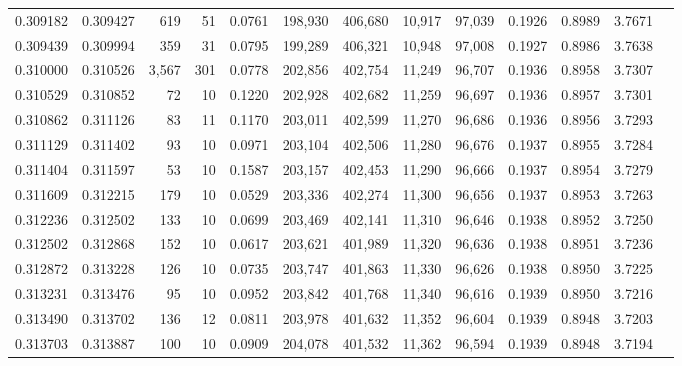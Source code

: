 \begin{tabular}{rrrrrrrrrrrrr}
0.309182 & 0.309427 &   619 &  51 &                                     0.0761 & 198,930 & 406,680 &  10,917 &  97,039 & 0.1926 & 0.8989 & 3.7671 \\
0.309439 & 0.309994 &   359 &  31 &                                     0.0795 & 199,289 & 406,321 &  10,948 &  97,008 & 0.1927 & 0.8986 & 3.7638 \\
0.310000 & 0.310526 & 3,567 & 301 &                                     0.0778 & 202,856 & 402,754 &  11,249 &  96,707 & 0.1936 & 0.8958 & 3.7307 \\
0.310529 & 0.310852 &    72 &  10 &                                     0.1220 & 202,928 & 402,682 &  11,259 &  96,697 & 0.1936 & 0.8957 & 3.7301 \\
0.310862 & 0.311126 &    83 &  11 &                                     0.1170 & 203,011 & 402,599 &  11,270 &  96,686 & 0.1936 & 0.8956 & 3.7293 \\
0.311129 & 0.311402 &    93 &  10 &                                     0.0971 & 203,104 & 402,506 &  11,280 &  96,676 & 0.1937 & 0.8955 & 3.7284 \\
0.311404 & 0.311597 &    53 &  10 &                                     0.1587 & 203,157 & 402,453 &  11,290 &  96,666 & 0.1937 & 0.8954 & 3.7279 \\
0.311609 & 0.312215 &   179 &  10 &                                     0.0529 & 203,336 & 402,274 &  11,300 &  96,656 & 0.1937 & 0.8953 & 3.7263 \\
0.312236 & 0.312502 &   133 &  10 &                                     0.0699 & 203,469 & 402,141 &  11,310 &  96,646 & 0.1938 & 0.8952 & 3.7250 \\
0.312502 & 0.312868 &   152 &  10 &                                     0.0617 & 203,621 & 401,989 &  11,320 &  96,636 & 0.1938 & 0.8951 & 3.7236 \\
0.312872 & 0.313228 &   126 &  10 &                                     0.0735 & 203,747 & 401,863 &  11,330 &  96,626 & 0.1938 & 0.8950 & 3.7225 \\
0.313231 & 0.313476 &    95 &  10 &                                     0.0952 & 203,842 & 401,768 &  11,340 &  96,616 & 0.1939 & 0.8950 & 3.7216 \\
0.313490 & 0.313702 &   136 &  12 &                                     0.0811 & 203,978 & 401,632 &  11,352 &  96,604 & 0.1939 & 0.8948 & 3.7203 \\
0.313703 & 0.313887 &   100 &  10 &                                     0.0909 & 204,078 & 401,532 &  11,362 &  96,594 & 0.1939 & 0.8948 & 3.7194 \\

\end{tabular}
